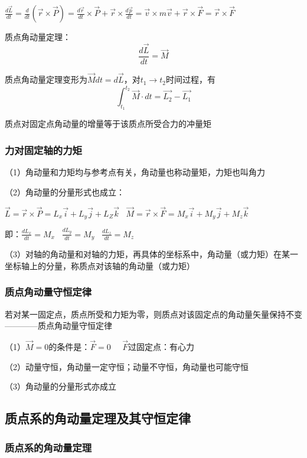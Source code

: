 \documentclass[UTF8]{article}
\begin{document}
    $\frac{d\vec{L}}{dt} = \frac{d}{dt}(\vec{r}\times\vec{P}) = \frac{d\vec{r}}{dt}\times\vec{P} + \vec{r}\times\frac{d\vec{p}}{dt} = \vec{v}\times m\vec{v} + \vec{r}\times\vec{F} = \vec{r}\times\vec{F}$

    质点角动量定理：\[\frac{d\vec{L}}{dt} = \vec{M}\]

    质点角动量定理变形为$\vec{M}dt = d\vec{L}$，对$t_1\rightarrow t_2$时间过程，有
    \[\int_{t_1}^{t_2}\vec{M}\cdot dt = \vec{L_2} - \vec{L_1}\]

    质点对固定点角动量的增量等于该质点所受合力的冲量矩

\subsubsection{力对固定轴的力矩}

    （1）角动量和力矩均与参考点有关，角动量也称动量矩，力矩也叫角力

    （2）角动量的分量形式也成立：
    
    $\vec{L} = \vec{r}\times\vec{P} = L_x\vec{i} + L_y\vec{j} + L_Z\vec{k}\;\;\;\vec{M} = \vec{r}\times\vec{F} = M_x\vec{i} + M_y\vec{j} + M_z\vec{k}$

    即：$\frac{dL_x}{dt} = M_x\;\;\;\frac{dL_y}{dt} = M_y\;\;\;\frac{dL_z}{dt} = M_z$

    （3）对轴的角动量和对轴的力矩，再具体的坐标系中，角动量（或力矩）在某一坐标轴上的分量，称质点对该轴的角动量（或力矩）

\subsubsection{质点角动量守恒定律}

    若对某一固定点，质点所受和力矩为零，则质点对该固定点的角动量矢量保持不变————质点角动量守恒定律

    （1）$\vec{M} = 0$的条件是：$\vec{F} = 0\;\;\;\;\;\vec{F}$过固定点：有心力

    （2）动量守恒，角动量一定守恒；动量不守恒，角动量也可能守恒

    （3）角动量的分量形式亦成立

\subsection{质点系的角动量定理及其守恒定律}
\subsubsection{质点系的角动量定理}
\end{document}
